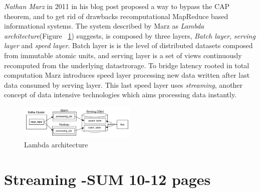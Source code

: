 \textit{Nathan Marz} in 2011 in his blog post\cite{beatCAP} proposed a way to bypass the CAP theorem, and to get rid of drawbacks recomputational MapReduce based informational systems. %
 The system described by Marz as \textit{Lambda architecture}(Figure ~\ref{fig:lambda}) suggests, is composed by three layers, \textit{Batch layer}, \textit{serving layer} and \textit{speed layer}. Batch layer is is the level of distributed datasets composed from immutable 
atomic units, and serving layer is a set of views continuously recomputed from the underlying datastrorage. To bridge latency rooted in total computation Marz introduces speed layer processing new data written after last data consumed by serving layer.
This last speed layer uses \textit{streaming}, another concept of data intensive technologies which aims processing data instantly.

\begin{figure}[!ht]
  \centering    
      \includegraphics[width=0.5\textwidth]{figures/lambda-architecture.png}
  \caption{Lambda architecture \cite{beatCAP}}
  \label{fig:lambda}
\end{figure}
 
\section{Streaming -SUM 10-12 pages } 
